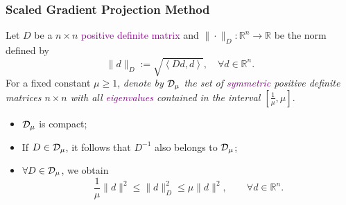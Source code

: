 \begin{frame}
  \frametitle{Scaled Gradient Projection Method}
  Let  $D$ be a $n\times n$ \textcolor{purple}{positive definite matrix} and $\| \cdot \|_{D} : \mathbb{R}^{n}\rightarrow \mathbb{R}$ be  the norm  defined by
  \begin{equation*}
    \|d\|_{D}:=\sqrt{\left\langle D d,d\right\rangle},\quad \forall d\in \mathbb{R}^{n}.
  \end{equation*}
  For a fixed  constant $\mu \geq 1$,  {\it denote by  ${\cal D}_{\mu}$  the set of \textcolor{purple}{symmetric} positive definite matrices $n\times n$ with all \textcolor{purple}{eigenvalues} contained in the interval $[\frac{1}{\mu}, \mu]$}.
  \begin{itemize}
    \item ${\cal D}_{\mu}$   is compact;
    \item If $D\in {\cal D}_{\mu}$, it follows that $D^{-1}$ also belongs to $ {\cal D}_{\mu}$;
    \item $\forall D\in {\cal D}_{\mu}$,  we obtain
          \begin{equation*}
            \frac{1}{\mu}\|d\|^2\leq \|d\|^2_{D}\leq \mu \|d\|^2, \qquad \forall d\in \mathbb{R}^n.
          \end{equation*}
  \end{itemize}
\end{frame}







